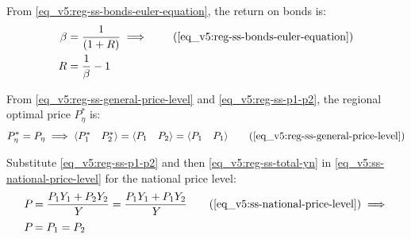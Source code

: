 \documentclass[../thesis.tex]{subfiles}
\begin{document}
	From \ref{eq_v5:reg-ss-bonds-euler-equation}, the return on bonds is:
	\begin{align}
		\beta &= \frac{1}{(1 + R)} \implies \tag{\ref{eq_v5:reg-ss-bonds-euler-equation}} \\
		R &= \frac{1}{\beta} - 1 \label{eq_v5:reg-ss-R}
	\end{align}

\begin{comment}
	
	From \ref{eq_v5:reg-ss-capital-euler-equation}, the return on capital $R_K$ for $\eta = 1$ is:
	\begin{align}
		1 &= \beta \left[ (1-\delta) + \frac{R_K}{P_{1}} \right] \implies \tag{\ref{eq_v5:reg-ss-capital-euler-equation}} \\
		R_K &= P_{1} \left[ \frac{1}{\beta} - (1-\delta) \right] \label{eq_v5:reg-ss-RK}
	\end{align}

	Divide \ref{eq_v5:reg-ss-RK} for $\eta = 1$ by \ref{eq_v5:reg-ss-RK} for $\eta = 2$:
	\begin{align}
		\frac{R_K}{R_K} &= \frac{P_{1} \left[ \frac{1}{\beta} - (1-\delta) \right]}{P_{2} \left[ \frac{1}{\beta} - (1-\delta) \right]} \implies \nonumber \\
		1 &= \frac{P_{1}}{P_{2}} \implies P_{1} = P_{2} \label{eq_v5:reg-ss-p1-p2}
	\end{align}

\end{comment}

From \ref{eq_v5:reg-ss-general-price-level} and \ref{eq_v5:reg-ss-p1-p2}, the regional optimal price $P_{\eta}^{\ast}$ is:
\begin{align}
	P_{\eta}^{\ast} = P_{\eta} \implies \langle \begin{matrix} P_{1}^{\ast} & P_{2}^{\ast} \end{matrix} \rangle = \langle \begin{matrix} P_{1} & P_{2} \end{matrix} \rangle = \langle \begin{matrix} P_{1} & P_{1} \end{matrix} \rangle \tag{\ref{eq_v5:reg-ss-general-price-level}}
\end{align}

Substitute \ref{eq_v5:reg-ss-p1-p2} and then \ref{eq_v5:reg-ss-total-yn} in \ref{eq_v5:ss-national-price-level} for the national price level:
	\begin{align}
		P_{} &= \frac{P_{1} Y_{1} + P_{2} Y_{2}}{Y_{}} = \frac{P_{1} Y_{1} + P_{1} Y_{2}}{Y_{}} \tag{\ref{eq_v5:ss-national-price-level}} \implies \nonumber \\
		P_{} &= P_{1} = P_{2} \label{eq_v5:reg-ss-P1-P2-P}
	\end{align}
\end{document}
